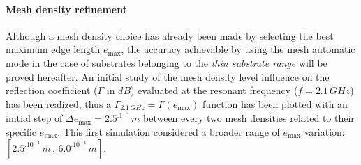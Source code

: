 \documentclass[12pt,a4paper]{article}
\begin{document}
{	\paragraph{\selectfont\color{Turquoise}Mesh density refinement}
	Although a mesh density choice has already been made by selecting the best maximum edge length $e_{\max}$, the accuracy achievable by using the mesh automatic mode in the case of substrates belonging to the  \emph{thin substrate range} will be proved hereafter. An initial study of the mesh density level influence on the reflection coefficient ($\Gamma$ in $dB$) evaluated at the resonant frequency ($f=2.1\,GHz$) has been realized, thus a  $\Gamma_{2.1\,GHz}=F(e_{\max})$ function has been plotted with an initial step of $\Delta e_{\max} = 2.5^.1^{-4}\,m$ between every two mesh densities related to their specific $e_{\max}$. This first simulation considered a broader range of $e_{\max}$ variation: $[2.5^.10^{-4}\,m\,,\,6.0^.10^{-4}\,m]$. 
	\begin{figure}[h]
		\begin{center}
			

\end{center}
\end{figure}}
\end{document}
